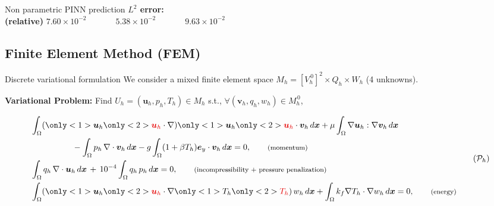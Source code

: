 \begin{frame}{Non parametric PINN prediction}
    \vspace{-8pt}
    \textbf{$L^2$ error:} \\
    \textbf{\small (relative)} \hspace{25pt} $7.60\times10^{-2} \hspace{42pt} 5.38\times10^{-2} \hspace{42pt}  9.63\times10^{-2}$

    \vspace{10pt}
\end{frame}

\subsection[FEM]{Finite Element Method (FEM)}

\begin{frame}{Discrete variational formulation}
	\vspace{-2pt}
	We consider a mixed finite element space $M_h = [V_h^{\, 0}]^2 \times Q_h \times W_h$ (4 unknowns).

    \vspace{5pt}
	\textbf{Variational Problem:} Find $U_h=(\bm{u}_h, p_h, T_h) \in M_h$ s.t., \; $\forall (\bm{v}_h, q_h, w_h) \in M_h^{\, 0} $,

	\footnotesize
	\begin{equation}
		\label{eq:weakform_nl}
		\begin{aligned}
			&\int_\Omega (\only<1>{\bm{u}_h}\only<2>{\textcolor{darkred}{\bm{u}_h}} \cdot \nabla)\only<1>{\bm{u}_h}\only<2>{\textcolor{darkred}{\bm{u}_h}} \cdot \bm{v}_h \, d\bm{x} + \mu \int_\Omega \nabla \bm{u}_h : \nabla \bm{v}_h \, d\bm{x} \\
			&\hspace{50pt} - \int_\Omega p_h \, \nabla \cdot \bm{v}_h \, d\bm{x} - g \int_\Omega (1 + \beta T_h) \bm{e}_y \cdot \bm{v}_h \, d\bm{x} = 0, \qquad\text{\footnotesize (momentum)} \\
			&\int_\Omega q_h \, \nabla \cdot \bm{u}_h \, d\bm{x} \, + \, 10^{-4} \int_\Omega q_h \, p_h \, d\bm{x} = 0, \qquad\text{\footnotesize (incompressibility + pressure penalization)}\\
			&\int_\Omega (\only<1>{\bm{u}_h}\only<2>{\textcolor{darkred}{\bm{u}_h}} \cdot \nabla \only<1>{T_h}\only<2>{\textcolor{darkred}{T_h}}) \, w_h \, d\bm{x} + \int_\Omega k_f \nabla T_h \cdot \nabla w_h \, d\bm{x} = 0,  \qquad\text{\footnotesize (energy)}
		\end{aligned}
		\tag{$\mathcal{P}_h$}
	\end{equation}

    \normalsize
\end{frame}


